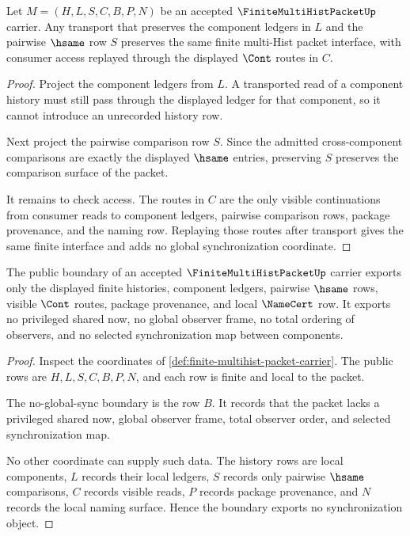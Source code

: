 \begin{theorem}
\label{thm:finite-multihist-packet-hsame-transport}
Let $M=(H,L,S,C,B,P,N)$ be an accepted $\FiniteMultiHistPacketUp$ carrier. Any transport that preserves the component ledgers in $L$ and the pairwise $\hsame$ row $S$ preserves the same finite multi-Hist packet interface, with consumer access replayed through the displayed $\Cont$ routes in $C$.
\end{theorem}
\begin{proof}
Project the component ledgers from $L$. A transported read of a component history must still pass through the displayed ledger for that component, so it cannot introduce an unrecorded history row.

Next project the pairwise comparison row $S$. Since the admitted cross-component comparisons are exactly the displayed $\hsame$ entries, preserving $S$ preserves the comparison surface of the packet.

It remains to check access. The routes in $C$ are the only visible continuations from consumer reads to component ledgers, pairwise comparison rows, package provenance, and the naming row. Replaying those routes after transport gives the same finite interface and adds no global synchronization coordinate.
\end{proof}

\begin{theorem}
\label{thm:finite-multihist-packet-no-sync-boundary}
The public boundary of an accepted $\FiniteMultiHistPacketUp$ carrier exports only the displayed finite histories, component ledgers, pairwise $\hsame$ rows, visible $\Cont$ routes, package provenance, and local $\NameCert$ row. It exports no privileged shared now, no global observer frame, no total ordering of observers, and no selected synchronization map between components.
\end{theorem}
\begin{proof}
Inspect the coordinates of \autoref{def:finite-multihist-packet-carrier}. The public rows are $H,L,S,C,B,P,N$, and each row is finite and local to the packet.

The no-global-sync boundary is the row $B$. It records that the packet lacks a privileged shared now, global observer frame, total observer order, and selected synchronization map.

No other coordinate can supply such data. The history rows are local components, $L$ records their local ledgers, $S$ records only pairwise $\hsame$ comparisons, $C$ records visible reads, $P$ records package provenance, and $N$ records the local naming surface. Hence the boundary exports no synchronization object.
\end{proof}

